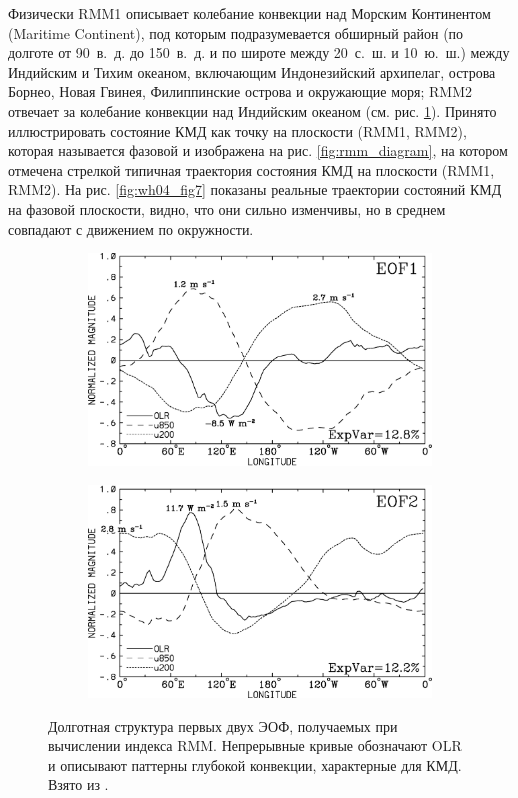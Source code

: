 Физически RMM1 описывает колебание конвекции над Морским Континентом (Ma\-ri\-time Continent), под которым подразумевается обширный район (по долготе от 90\textdegree~в.~д. до 150\textdegree~в.~д. и по широте между 20\textdegree~с.~ш. и 10\textdegree~ю.~ш.) между Индийским и Тихим океаном, включающим Индонезийский архипелаг, острова Борнео, Новая Гвинея, Филиппинские острова и окружающие моря; RMM2 отвечает за колебание конвекции над Индийским океаном (см. рис. \ref{fig:wh04_fig1}). Принято иллюстрировать состояние КМД как точку на плоскости (RMM1, RMM2), которая называется фазовой и изображена на рис. \ref{fig:rmm_diagram}, на котором отмечена стрелкой типичная траектория состояния КМД на плоскости (RMM1, RMM2). На рис. \ref{fig:wh04_fig7} показаны реальные траектории состояний КМД на фазовой плоскости, видно, что они сильно изменчивы, но в среднем совпадают с движением по окружности.

\begin{figure}[t]  
    \centering
    \begin{subfigure}{.49\textwidth}
		\centering
		\includegraphics[width=\textwidth]{figures/wh04_fig1_eof1.png}
    \end{subfigure}
    \hfill
    \begin{subfigure}{.49\textwidth}
		\centering
		\includegraphics[width=\textwidth]{figures/wh04_fig1_eof2.png}
    \end{subfigure}
    \caption{Долготная структура первых двух ЭОФ, получаемых при вычислении индекса RMM. Непрерывные кривые обозначают OLR и описывают паттерны глубокой конвекции, характерные для КМД. Взято из \cite[рис. 1]{Wheeler_Hendon_2004}.}
	\label{fig:wh04_fig1}
\end{figure}

